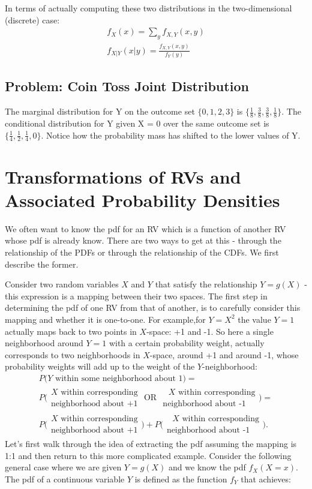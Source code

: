 In terms of actually computing these two distributions in the two-dimensional (discrete) case:
\begin{align}
f_X(x) = \sum_y f_{X,Y}(x,y)\\
f_{X|Y}(x|y) =  \frac{f_{X,Y}(x,y)}{f_Y(y)}
\end{align}



\subsection{Problem: Coin Toss Joint Distribution}
The marginal distribution for Y on the outcome set $\{0, 1, 2, 3\}$ is $\{\frac{1}{8}, \frac{3}{8},\frac{3}{8},\frac{1}{8}\}$. The conditional distribution for Y given X = 0 over the same outcome set is $\{\frac{1}{4}, \frac{1}{2},\frac{1}{4},0\}$. Notice how the probability mass has shifted to the lower values of Y.


\section{Transformations of RVs and Associated Probability Densities}
We often want to know the pdf for an RV which is a function of another RV whose pdf is already know. There are two ways to get at this - through the relationship of the PDFs or through the relationship of the CDFs. We first describe the former.
\n

Consider two random variables $X$ and $Y$ that satisfy the relationship $Y=g(X)$ - this expression is a mapping between their two spaces. The first step in determining the pdf of one RV from that of another, is to carefully consider this mapping and whether it is one-to-one. For example,for $Y=X^2$ the value $Y=1$ actually maps back to two points in $X$-space: +1 and -1. So here a single neighborhood around $Y=1$ with a certain probability weight, actually corresponds to two neighborhoods in $X$-space, around +1 and around -1, whose probability weights will add up to the weight of the $Y$-neighborhood:
\begin{align*}
 P\bigg(\textrm{$Y$ within some neighborhood about 1}\bigg) =\\
 P\bigg(\substack{\text{$X$ within corresponding    }\\\text{neighborhood about +1    }}\text{OR }\substack{\text{ $X$ within corresponding}\\\text{neighborhood about -1}}\bigg) =\\
  P\bigg(\substack{\text{$X$ within corresponding}\\\text{neighborhood about +1}}\bigg) + P\bigg(\substack{\text{ $X$ within corresponding}\\\text{neighborhood about -1}}\bigg).
 \end{align*}
Let's first walk through the idea of extracting the pdf assuming the mapping is 1:1 and then return to this more complicated example. Consider the following general case where we are given $Y=g(X)$ and we know the pdf $f_X(X=x)$. The pdf of a continuous variable $Y$ is defined as the function $f_Y$ that achieves:

